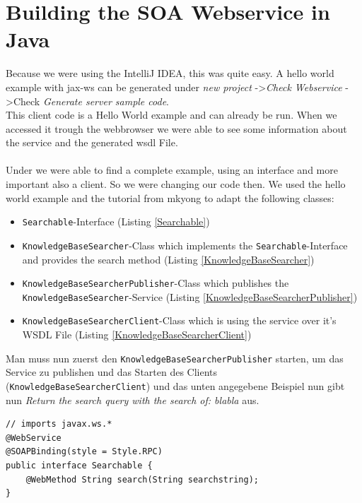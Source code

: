 \documentclass[12pt]{article}
\begin{document}
\section{Building the SOA Webservice in Java}
Because we were using the IntelliJ IDEA, this was quite easy.
A hello world example with jax-ws can be generated under \textit{new project} -\textgreater \textit{Check Webservice } -\textgreater Check \textit{Generate server sample code}. \\
This client code is a Hello World example and can already be run. When we accessed it trough the webbrowser we were able to see some information about the service and the generated wsdl File.\\
\\
Under \cite{mkyongjaxwsexample} we were able to find a complete example, using an interface and more important also a client. So we were changing our code then. We used the hello world example and the tutorial from mkyong to adapt the following classes:\\
\begin{itemize}
\item \texttt{Searchable}-Interface (Listing \ref{Searchable})
\item \texttt{KnowledgeBaseSearcher}-Class which implements the \texttt{Searchable}-Interface and provides the search method (Listing \ref{KnowledgeBaseSearcher})
\item \texttt{KnowledgeBaseSearcherPublisher}-Class which publishes the \texttt{KnowledgeBaseSearcher}-Service  (Listing \ref{KnowledgeBaseSearcherPublisher})
\item \texttt{KnowledgeBaseSearcherClient}-Class which is using the service over it's WSDL File (Listing \ref{KnowledgeBaseSearcherClient})
\end{itemize}
Man muss nun zuerst den \texttt{KnowledgeBaseSearcherPublisher} starten, um das Service zu publishen und das Starten des Clients (\texttt{KnowledgeBaseSearcherClient}) und das unten angegebene Beispiel nun gibt nun
\textit{Return the search query with the search of: blabla} aus.

\begin{lstlisting}[caption=Searchable interface, label=Searchable]
// imports javax.ws.*
@WebService
@SOAPBinding(style = Style.RPC)
public interface Searchable {
    @WebMethod String search(String searchstring);
}
\end{lstlisting}
\end{document}
